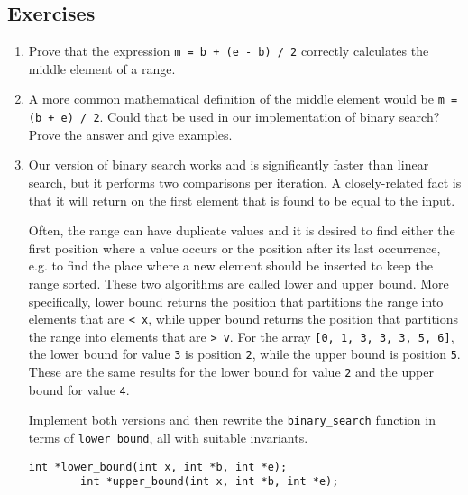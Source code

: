 \subsection{Exercises}

\begin{enumerate}[label*=\arabic*.]
    \item
        \label{ex:algo:bsearch_middle}
        Prove that the expression \texttt{m = b + (e - b) / 2} correctly
        calculates the middle element of a range.
    \item
        \label{ex:algo:bsearch_overflow}
        A more common mathematical definition of the middle element would be
        \texttt{m = (b + e) / 2}.  Could that be used in our implementation of
        binary search?  Prove the answer and give examples.
    \item
        \label{ex:algo:bsearch_bound}
        Our version of binary search works and is significantly faster than
        linear search, but it performs two comparisons per iteration.  A
        closely-related fact is that it will return on the first element that is
        found to be equal to the input.

        Often, the range can have duplicate values and it is desired to find
        either the first position where a value occurs or the position after its
        last occurrence, e.g. to find the place where a new element should be
        inserted to keep the range sorted.  These two algorithms are called
        lower and upper bound.  More specifically, lower bound returns the
        position that partitions the range into elements that are \texttt{< x},
        while upper bound returns the position that partitions the range into
        elements that are \texttt{> v}.  For the array \texttt{[0, 1, 3, 3, 3,
        5, 6]}, the lower bound for value \texttt{3} is position \texttt{2},
        while the upper bound is position \texttt{5}.  These are the same
        results for the lower bound for value \texttt{2} and the upper bound for
        value \texttt{4}.

        Implement both versions and then rewrite the \texttt{binary\_search}
        function in terms of \texttt{lower\-\_bound}, all with suitable
        invariants.

        \begin{lstlisting}[style=c]
        int *lower_bound(int x, int *b, int *e);
        int *upper_bound(int x, int *b, int *e);
        \end{lstlisting}
\end{enumerate}
